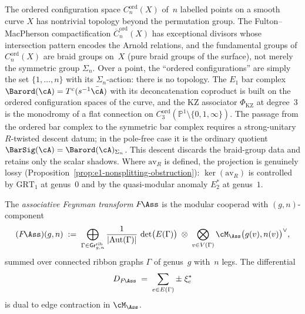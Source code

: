 \begin{remark}
\label{rem:e1-ordered-configs-curve-vs-point}
The ordered configuration space $C_n^{\mathrm{ord}}(X)$ of~$n$
labelled points on a smooth curve $X$ has nontrivial topology
beyond the permutation group. The Fulton--MacPherson
compactification $\overline{C}_n^{\mathrm{ord}}(X)$ has
exceptional divisors whose intersection pattern encodes the
Arnold relations, and the fundamental groups of
$C_n^{\mathrm{ord}}(X)$ are braid groups on~$X$
\textup{(}pure braid groups of the surface\textup{)}, not
merely the symmetric group $\Sigma_n$. Over a point, the
``ordered configurations'' are simply the set
$\{1, \ldots, n\}$ with its $\Sigma_n$-action: there is
no topology. The $E_1$ bar complex
$\Barord(\cA) = T^c(s^{-1}\bar\cA)$ with its
deconcatenation coproduct is built on the ordered
configuration spaces of the curve, and the KZ associator
$\Phi_{\mathrm{KZ}}$ at degree~$3$ is the monodromy of a
flat connection on $C_3^{\mathrm{ord}}(\mathbb{P}^1
\setminus \{0,1,\infty\})$. The passage from the ordered bar complex
to the symmetric bar complex requires a strong-unitary $R$-twisted
descent datum; in the pole-free case it is the ordinary quotient
$\BarSig(\cA)=\Barord(\cA)_{\Sigma_n}$. This descent discards the
braid-group data and retains only the scalar shadows. Where
$\mathrm{av}_R$ is defined, the projection is genuinely lossy
\textup{(}Proposition~\textup{\ref{prop:e1-nonsplitting-obstruction})}:
$\ker(\mathrm{av}_R)$ is controlled by $\mathrm{GRT}_1$ at genus~$0$
and by the quasi-modular anomaly $E_2^*$ at genus~$1$.
\end{remark}

\begin{definition}
\label{def:feynman-transform-ass}
\ClaimStatusProvedElsewhere
{}
The \emph{associative Feynman transform} $F\!\Ass$ is the modular
cooperad with $(g,n)$-component
\begin{equation}
\label{eq:fass-definition}
(F\!\Ass)(g,n)
\;:=\;
\bigoplus_{\Gamma \in \mathsf{Gr}^{\mathrm{rib}}_{g,n}}
\frac{1}{|\!\operatorname{Aut}(\Gamma)|}\,
\det\bigl(E(\Gamma)\bigr)
\;\otimes\;
\bigotimes_{v \in V(\Gamma)}
\cM_{\Ass}\bigl(g(v), n(v)\bigr)^{\vee},
\end{equation}
summed over connected ribbon graphs $\Gamma$ of genus~$g$ with~$n$
legs. The differential
\begin{equation}
\label{eq:fass-differential}
D_{F\!\Ass}
\;=\;
\sum_{e \in E(\Gamma)}
\pm\; \xi_e^*
\end{equation}
is dual to edge contraction in $\cM_\Ass$.
\end{definition}

